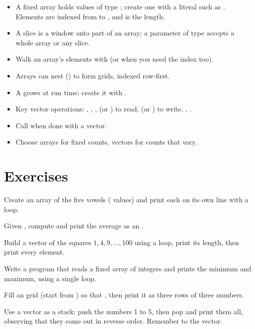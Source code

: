 \begin{itemize}[leftmargin=1.4em]
  \item A fixed array  holds  values of type ;
        create one with a literal such as . Elements are
        indexed from  to , and  is the length.
  \item A slice  is a window onto part of an array; a
        parameter of type  accepts a whole array or any slice.
  \item Walk an array's elements with  (or
         when you need the index too).
  \item Arrays can nest () to form grids, indexed row-first.
  \item A  grows at run time; create it with
        .
  \item Key vector operations: , , ,
         (or ) to read,  (or
        ) to write, , .
  \item Call  when done with a vector.
  \item Choose arrays for fixed counts, vectors for counts that vary.
\end{itemize}

\section{Exercises}

\exercise Create an array of the five vowels ( values) and print each
on its own line with a loop.

\exercise Given , compute and print the
average as an .

\exercise Build a vector of the squares $1, 4, 9, \dots, 100$ using a loop, print
its length, then print every element.

\exercise Write a program that reads a fixed array of integers and prints the
minimum and maximum, using a single loop.

\exercise Fill an  grid (start from
\code{[[0, 0, 0], [0, 0, 0], [0, 0, 0]]}) so that , then
print it as three rows of three numbers.

\exercise Use a vector as a stack: push the numbers 1 to 5, then pop and print
them all, observing that they come out in reverse order. Remember to
 the vector.
